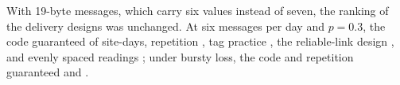With 19-byte messages, which carry six values instead of seven, the ranking of the delivery designs was unchanged. At six messages per day and $p = 0.3$, the code guaranteed \vSixCodeInd{} of site-days, repetition \vSixRepInd{}, tag practice \vSixSrdlInd{}, the reliable-link design \vSixRelInd{}, and evenly spaced readings \vSixRawInd{}; under bursty loss, the code and repetition guaranteed \vSixCodeBur{} and \vSixRepBur{}.
